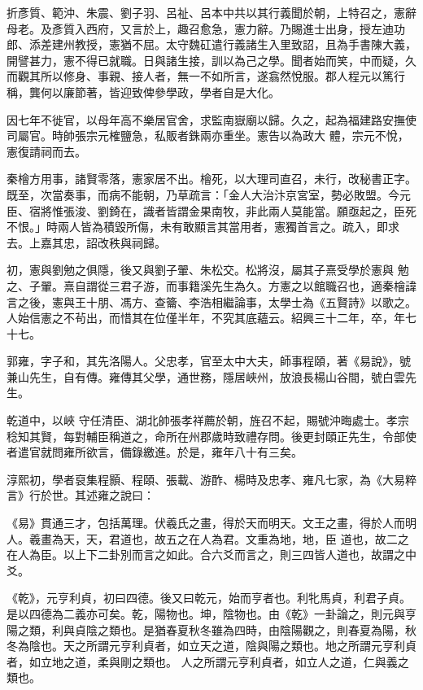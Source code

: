 \begin{pinyinscope}
 折彥質、範沖、朱震、劉子羽、呂祉、呂本中共以其行義聞於朝，上特召之，憲辭母老。及彥質入西府，又言於上，趣召愈急，憲力辭。乃賜進士出身，授左迪功
 郎、添差建州教授，憲猶不屈。太守魏矼遣行義諸生入里致詔，且為手書陳大義，開譬甚力，憲不得已就職。日與諸生接，訓以為己之學。聞者始而笑，中而疑，久而觀其所以修身、事親、接人者，無一不如所言，遂翕然悅服。郡人程元以篤行稱，龔何以廉節著，皆迎致俾參學政，學者自是大化。



 因七年不徙官，以母年高不樂居官舍，求監南嶽廟以歸。久之，起為福建路安撫使司屬官。時帥張宗元榷鹽急，私販者銖兩亦重坐。憲告以為政大
 體，宗元不悅，憲復請祠而去。



 秦檜方用事，諸賢零落，憲家居不出。檜死，以大理司直召，未行，改秘書正字。既至，次當奏事，而病不能朝，乃草疏言：「金人大治汴京宮室，勢必敗盟。今元臣、宿將惟張浚、劉錡在，識者皆謂金果南牧，非此兩人莫能當。願亟起之，臣死不恨。」時兩人皆為積毀所傷，未有敢顯言其當用者，憲獨首言之。疏入，即求去。上嘉其忠，詔改秩與祠歸。



 初，憲與劉勉之俱隱，後又與劉子翬、朱松交。松將沒，屬其子熹受學於憲與
 勉之、子翬。熹自謂從三君子游，而事籍溪先生為久。方憲之以館職召也，適秦檜諱言之後，憲與王十朋、馮方、查籥、李浩相繼論事，太學士為《五賢詩》以歌之。人始信憲之不茍出，而惜其在位僅半年，不究其底蘊云。紹興三十二年，卒，年七十七。



 郭雍，字子和，其先洛陽人。父忠孝，官至太中大夫，師事程頤，著《易說》，號兼山先生，自有傳。雍傳其父學，通世務，隱居峽州，放浪長楊山谷間，號白雲先生。



 乾道中，以峽
 守任清臣、湖北帥張孝祥薦於朝，旌召不起，賜號沖晦處士。孝宗稔知其賢，每對輔臣稱道之，命所在州郡歲時致禮存問。後更封頤正先生，令部使者遣官就問雍所欲言，備錄繳進。於是，雍年八十有三矣。



 淳熙初，學者裒集程顥、程頤、張載、游酢、楊時及忠孝、雍凡七家，為《大易粹言》行於世。其述雍之說曰：



 《易》貫通三才，包括萬理。伏羲氏之畫，得於天而明天。文王之畫，得於人而明人。羲畫為天，天，君道也，故五之在人為君。文重為地，地，臣
 道也，故二之在人為臣。以上下二卦別而言之如此。合六爻而言之，則三四皆人道也，故謂之中爻。



 《乾》，元亨利貞，初曰四德。後又曰乾元，始而亨者也。利牝馬貞，利君子貞。是以四德為二義亦可矣。乾，陽物也。坤，陰物也。由《乾》一卦論之，則元與亨陽之類，利與貞陰之類也。是猶春夏秋冬雖為四時，由陰陽觀之，則春夏為陽，秋冬為陰也。天之所謂元亨利貞者，如立天之道，陰與陽之類也。地之所謂元亨利貞者，如立地之道，柔與剛之類也。
 人之所謂元亨利貞者，如立人之道，仁與義之類也。




\end{pinyinscope}

